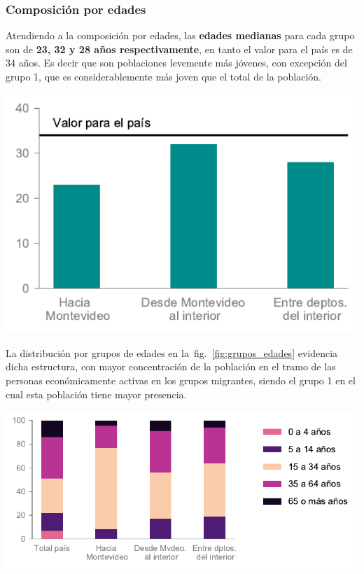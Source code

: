 \documentclass[12pt,spanish,]{article}
\let\origfigure\figure
\let\endorigfigure\endfigure
\renewenvironment{figure}[1][2] {
    \expandafter\origfigure\expandafter[H]
} {
    \endorigfigure
}
\begin{document}
\hypertarget{composiciuxf3n-por-edades}{%
\subsubsection{Composición por edades}\label{composiciuxf3n-por-edades}}

Atendiendo a la composición por edades, las \textbf{edades medianas}
para cada grupo son de \textbf{23, 32 y 28 años respectivamente}, en
tanto el valor para el país es de 34 años. Es decir que son poblaciones
levemente más jóvenes, con excepción del grupo 1, que es
considerablemente más joven que el total de la población.

\begin{figure}
\hypertarget{fig:edad_mediana}{%
\centering
\includegraphics{./tex2pdf.-8c1f0593c1a83dbe/8922d0cd3e2baebc1841ef9a39ff35a49fdb43fc.pdf}
\caption{Edades medianas para el total de personas y para los
subconjuntos de migrantes internos recientes.}\label{fig:edad_mediana}
}
\end{figure}

La distribución por grupos de edades en la~fig.~\ref{fig:grupos_edades}
evidencia dicha estructura, con mayor concentración de la población en
el tramo de las personas económicamente activas en los grupos migrantes,
siendo el grupo 1 en el cual esta población tiene mayor presencia.

\begin{figure}
\hypertarget{fig:grupos_edades}{%
\centering
\includegraphics{./tex2pdf.-8c1f0593c1a83dbe/7a56c14120518b80c5308689d935792c3446129b.pdf}
\caption{Distribución por grupos de edades.}\label{fig:grupos_edades}
}
\end{figure}
\end{document}
